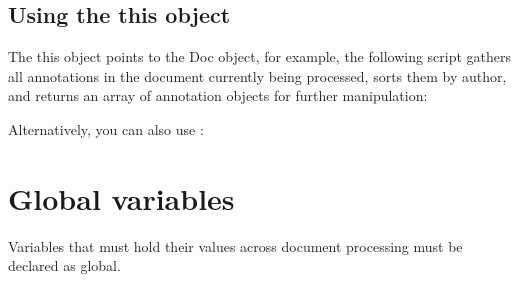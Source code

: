 \documentclass[letterpaper,12pt,english,openany,oneside]{sphinxmanual}
\begin{document}
\begin{sphinxVerbatim}[commandchars=\\\{\}]
 
           
          
          
       
          
       
\end{sphinxVerbatim}


\subsection{Using the this object}
\label{\detokenize{index:using-the-this-object}}
The this object points to the Doc object, for example, the following script gathers all annotations in the document currently being processed, sorts them by author, and returns an array of annotation objects for further manipulation:

\begin{sphinxVerbatim}[commandchars=\\\{\}]
    
\end{sphinxVerbatim}

Alternatively, you can also use  :

\begin{sphinxVerbatim}[commandchars=\\\{\}]
    
\end{sphinxVerbatim}


\section{Global variables}
\label{\detokenize{index:global-variables}}
Variables that must hold their values across document processing must be declared as global.
\end{document}
